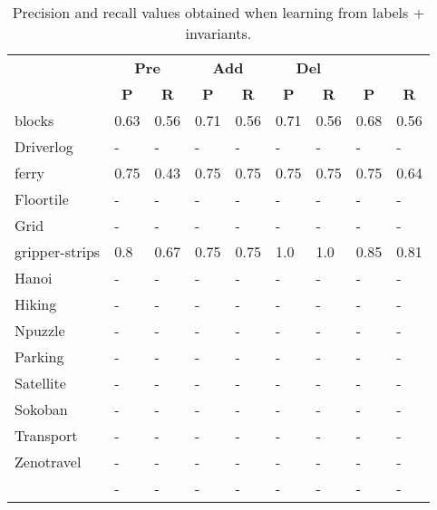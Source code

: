 \documentclass{article}
\begin{document}
\begin{table}[hbt!]
	\begin{scriptsize}
		\begin{center}
			\begin{tabular}{l|l|l|l|l|l|l||l|l|}
				& \multicolumn{2}{|c|}{\bf Pre} & \multicolumn{2}{|c|}{\bf Add} & \multicolumn{2}{|c||}{\bf Del} & \multicolumn{2}{|c}{\bf}\\ \cline{2-9}			
				& \multicolumn{1}{|c|}{\bf P} & \multicolumn{1}{|c|}{\bf R} & \multicolumn{1}{|c|}{\bf P} & \multicolumn{1}{|c|}{\bf R} & \multicolumn{1}{|c|}{\bf P} & \multicolumn{1}{|c||}{\bf R} &  \multicolumn{1}{|c|}{\bf P} & \multicolumn{1}{|c|}{\bf R} \\
				\hline
				blocks & 0.63 & 0.56 & 0.71 & 0.56 & 0.71 & 0.56 & 0.68 & 0.56 \\
				Driverlog & - & - & - & - & - & - & - & - \\ %
				ferry & 0.75 & 0.43 & 0.75 & 0.75 & 0.75 & 0.75 & 0.75 & 0.64 \\
				Floortile & - & - & - & - & - & - & - & - \\ %
				Grid & - & - & - & - & - & - & - & - \\ %
				gripper-strips & 0.8 & 0.67 & 0.75 & 0.75 & 1.0 & 1.0 & 0.85 & 0.81 \\                                                                                                                                                                       
				Hanoi & - & - & - & - & - & - & - & - \\ %
				Hiking & - & - & - & - & - & - & - & - \\ %
				Npuzzle & - & - & - & - & - & - & - & - \\ %
				Parking & - & - & - & - & - & - & - & - \\ %
				Satellite & - & - & - & - & - & - & - & - \\ %
				Sokoban & - & - & - & - & - & - & - & - \\ %
				Transport & - & - & - & - & - & - & - & - \\ %
				Zenotravel & - & - & - & - & - & - & - & - \\ %
				\hline
				\bf  & - & - & - & - & - & - & - & - \\
			\end{tabular}
		\end{center}
	\end{scriptsize}
	\caption{\small Precision and recall values obtained when learning from labels + invariants.}
	\label{fig:invariants}
\end{table}
\end{document}
